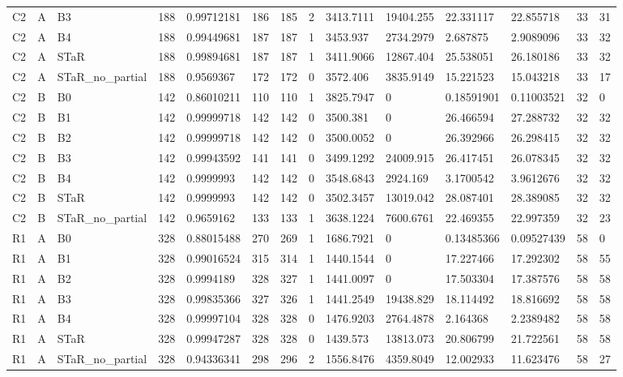 \begin{longtable}{llllllllllllll}
C2 & A & B3 & 188 & 0.99712181 & 186 & 185 & 2 & 3413.7111 & 19404.255 & 22.331117 & 22.855718 & 33 & 31 \\
C2 & A & B4 & 188 & 0.99449681 & 187 & 187 & 1 & 3453.937 & 2734.2979 & 2.687875 & 2.9089096 & 33 & 32 \\
C2 & A & STaR & 188 & 0.99894681 & 187 & 187 & 1 & 3411.9066 & 12867.404 & 25.538051 & 26.180186 & 33 & 32 \\
C2 & A & STaR\_no\_partial & 188 & 0.9569367 & 172 & 172 & 0 & 3572.406 & 3835.9149 & 15.221523 & 15.043218 & 33 & 17 \\
C2 & B & B0 & 142 & 0.86010211 & 110 & 110 & 1 & 3825.7947 & 0 & 0.18591901 & 0.11003521 & 32 & 0 \\
C2 & B & B1 & 142 & 0.99999718 & 142 & 142 & 0 & 3500.381 & 0 & 26.466594 & 27.288732 & 32 & 32 \\
C2 & B & B2 & 142 & 0.99999718 & 142 & 142 & 0 & 3500.0052 & 0 & 26.392966 & 26.298415 & 32 & 32 \\
C2 & B & B3 & 142 & 0.99943592 & 141 & 141 & 0 & 3499.1292 & 24009.915 & 26.417451 & 26.078345 & 32 & 32 \\
C2 & B & B4 & 142 & 0.9999993 & 142 & 142 & 0 & 3548.6843 & 2924.169 & 3.1700542 & 3.9612676 & 32 & 32 \\
C2 & B & STaR & 142 & 0.9999993 & 142 & 142 & 0 & 3502.3457 & 13019.042 & 28.087401 & 28.389085 & 32 & 32 \\
C2 & B & STaR\_no\_partial & 142 & 0.9659162 & 133 & 133 & 1 & 3638.1224 & 7600.6761 & 22.469355 & 22.997359 & 32 & 23 \\
R1 & A & B0 & 328 & 0.88015488 & 270 & 269 & 1 & 1686.7921 & 0 & 0.13485366 & 0.09527439 & 58 & 0 \\
R1 & A & B1 & 328 & 0.99016524 & 315 & 314 & 1 & 1440.1544 & 0 & 17.227466 & 17.292302 & 58 & 55 \\
R1 & A & B2 & 328 & 0.9994189 & 328 & 327 & 1 & 1441.0097 & 0 & 17.503304 & 17.387576 & 58 & 58 \\
R1 & A & B3 & 328 & 0.99835366 & 327 & 326 & 1 & 1441.2549 & 19438.829 & 18.114492 & 18.816692 & 58 & 58 \\
R1 & A & B4 & 328 & 0.99997104 & 328 & 328 & 0 & 1476.9203 & 2764.4878 & 2.164368 & 2.2389482 & 58 & 58 \\
R1 & A & STaR & 328 & 0.99947287 & 328 & 328 & 0 & 1439.573 & 13813.073 & 20.806799 & 21.722561 & 58 & 58 \\
R1 & A & STaR\_no\_partial & 328 & 0.94336341 & 298 & 296 & 2 & 1556.8476 & 4359.8049 & 12.002933 & 11.623476 & 58 & 27 \\

\end{longtable}
